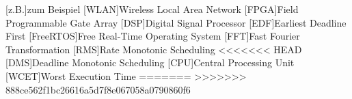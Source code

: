 \documentclass[../EDF Master Thesis.tex]{subfiles}
\begin{document}
    \begin{acronym}[abkuerzungen]
        [z.B.]{zum Beispiel}
        [WLAN]{Wireless Local Area Network}
        [FPGA]{Field Programmable Gate Array}
        [DSP]{Digital Signal Processor}
        [EDF]{Earliest Deadline First}
        [FreeRTOS]{Free Real-Time Operating System}
        [FFT]{Fast Fourier Transformation}
        [RMS]{Rate Monotonic Scheduling}
<<<<<<< HEAD
        [DMS]{Deadline Monotonic Scheduling}
        [CPU]{Central Processing Unit}
        [WCET]{Worst Execution Time}
=======
>>>>>>> 888ce562f1bc26616a5d7f8e067058a0790860f6
	\end{acronym}
\end{document}
